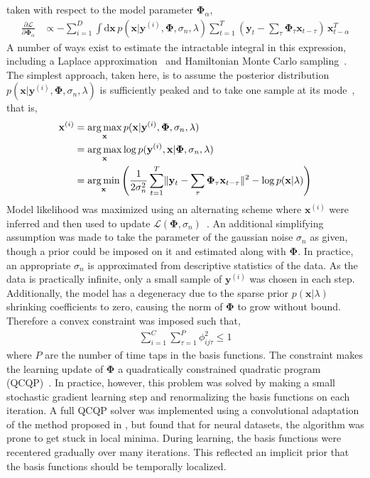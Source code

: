 \documentclass[10pt]{article}
\newcommand{\mb}{\mathbf}
\newcommand{\norm}[1]{\lVert#1\rVert}
\newcommand\argmin{\operatornamewithlimits{arg\,min}}
\newcommand\argmax{\operatornamewithlimits{arg\,max}}
\begin{document}
taken with respect to the model parameter $\mathbf{\Phi}_\alpha$,
\begin{align*}
  \frac{\partial \mathcal{L}}{\partial \mathbf{\Phi}_\alpha} &\propto
  - \sum_{i=1}^D {\int \mathrm{d} \mb{x} \, p(\mb{x} | \mb{y}^{(i)},
    \mb{\Phi}, \sigma_n, \lambda) \sum_{t=1}^T (\mb{y}_t - \sum_\tau
    \mb{\Phi}_\tau \mb{x}_{t-\tau}) \,\mb{x}_{t-\alpha}^T}
\end{align*}
A number of ways exist to estimate the intractable integral in this
expression, including a Laplace
approximation~\cite{lewicki1999probabilistic} and Hamiltonian Monte
Carlo sampling~\cite{culpepperbuilding}. The simplest approach, taken
here, is to assume the posterior distribution $p(\mb{x} |
\mb{y}^{(i)}, \mb{\Phi}, \sigma_n, \lambda)$ is sufficiently peaked
and to take one sample at its mode~\cite{Olshausen97}, that is,
\begin{align}
  \mb{x}^{(i)} &= \argmax_{\mathbf{x}} p(\mb{x} | \mb{y}^{(i)},
  \mb{\Phi}, \sigma_n,
  \lambda) \nonumber \\
  &= \argmax_{\mb{x}} \log p(\mb{y}^{(i)}, \mb{x} |\mb{\Phi},
  \sigma_n, \lambda) \nonumber \\
  &= \argmin_{\mb{x}}\left( \frac{1}{2 \sigma_n^2} \sum_{t=1}^T
    \norm{\mb{y}_t - \sum_\tau \mb{\Phi}_\tau \mb{x}_{t-\tau}}^2 -
    \log p(\mb{x}|\lambda) \right)\label{eqn:inference}
\end{align}
Model likelihood was maximized using an alternating scheme where
$\mb{x}^{(i)}$ were inferred and then used to update
$\mathcal{L}(\mb{\Phi},\sigma_n)$~\cite{Olshausen97}. An additional
simplifying assumption was made to take the parameter of the gaussian
noise $\sigma_n$ as given, though a prior could be imposed on it and
estimated along with $\mb{\Phi}$. In practice, an appropriate
$\sigma_n$ is approximated from descriptive statistics of the data. As
the data is practically infinite, only a small sample of
$\mb{y}^{(i)}$ was chosen in each step. Additionally, the model has a
degeneracy due to the sparse prior $p(\mb{x}|\lambda)$ shrinking
coefficients to zero, causing the norm of $\mb{\Phi}$ to grow without
bound. Therefore a convex constraint was imposed such that,
\begin{align*}
  \sum_{i=1}^C\sum_{\tau=1}^P\phi_{ij\tau}^2 \le 1
\end{align*}
where $P$ are the number of time taps in the basis functions. The
constraint makes the learning update of $\mb{\Phi}$ a quadratically
constrained quadratic program (QCQP)~\cite{boyd2004convex}. In
practice, however, this problem was solved by making a small
stochastic gradient learning step and renormalizing the basis
functions on each iteration. A full QCQP solver was implemented using
a convolutional adaptation of the method proposed in
\cite{mairal2010online}, but found that for neural datasets, the
algorithm was prone to get stuck in local minima. During learning, the
basis functions were recentered gradually over many iterations. This
reflected an implicit prior that the basis functions should be
temporally localized.
\end{document}
